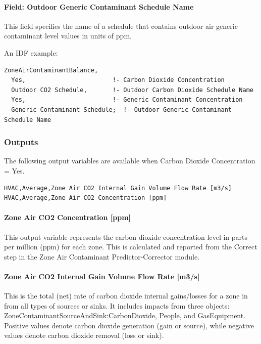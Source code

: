 \paragraph{Field: Outdoor Generic Contaminant Schedule Name}\label{field-outdoor-generic-contaminant-schedule-name}

This field specifies the name of a schedule that contains outdoor air generic contaminant level values in units of ppm.

An IDF example:

\begin{lstlisting}
ZoneAirContaminantBalance,
  Yes,                        !- Carbon Dioxide Concentration
  Outdoor CO2 Schedule,       !- Outdoor Carbon Dioxide Schedule Name
  Yes,                        !- Generic Contaminant Concentration
  Generic Contaminant Schedule;  !- Outdoor Generic Contaminant Schedule Name
\end{lstlisting}

\subsubsection{Outputs}\label{outputs-033}

The following output variables are available when Carbon Dioxide Concentration = Yes.

\begin{lstlisting}
HVAC,Average,Zone Air CO2 Internal Gain Volume Flow Rate [m3/s]
HVAC,Average,Zone Air CO2 Concentration [ppm]
\end{lstlisting}

\paragraph{Zone Air CO2 Concentration {[}ppm{]}}\label{zone-air-co2-concentration-ppm}

This output variable represents the carbon dioxide concentration level in parts per million (ppm) for each zone. This is calculated and reported from the Correct step in the Zone Air Contaminant Predictor-Corrector module.

\paragraph{Zone Air CO2 Internal Gain Volume Flow Rate {[}m3/s{]}}\label{zone-air-co2-internal-gain-volume-flow-rate-m3s}

This is the total (net) rate of carbon dioxide internal gains/losses for a zone in \si{\volumeFlowRate} from all types of sources or sinks. It includes impacts from three objects: ZoneContaminantSourceAndSink:CarbonDioxide, People, and GasEquipment. Positive values denote carbon dioxide generation (gain or source), while negative values denote carbon dioxide removal (loss or sink).


